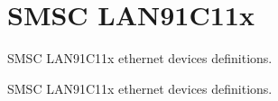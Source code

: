 \hypertarget{group__arm__csb336__lan91c11x}{}\section{S\+M\+SC L\+A\+N91\+C11x}
\label{group__arm__csb336__lan91c11x}


S\+M\+SC L\+A\+N91\+C11x ethernet devices definitions.  


S\+M\+SC L\+A\+N91\+C11x ethernet devices definitions. 

